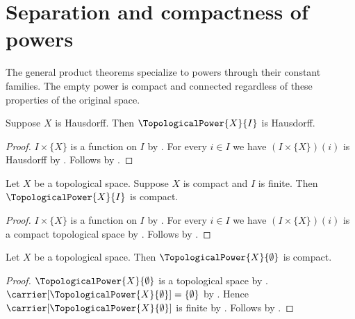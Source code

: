 \section{Separation and compactness of powers}






The general product theorems specialize to powers through their constant
families. The empty power is compact and connected regardless of these
properties of the original space.

\begin{theorem}\label{topological_power_is_hausdorff}
    Suppose $X$ is Hausdorff.
    Then $\TopologicalPower{X}{I}$ is Hausdorff.
\end{theorem}
\begin{proof}
    $I\times\{X\}$ is a function on $I$ by .
    For every $i\in I$ we have $(I\times\{X\})(i)$ is Hausdorff by
        .
    Follows by .
\end{proof}

\begin{theorem}\label{finite_topological_power_is_compact}
    Let $X$ be a topological space.
    Suppose $X$ is compact and $I$ is finite.
    Then $\TopologicalPower{X}{I}$ is compact.
\end{theorem}
\begin{proof}
    $I\times\{X\}$ is a function on $I$ by .
    For every $i\in I$ we have $(I\times\{X\})(i)$ is a compact topological space by
        .
    Follows by .
\end{proof}

\begin{theorem}\label{empty_topological_power_is_compact}
    Let $X$ be a topological space.
    Then $\TopologicalPower{X}{\emptyset}$ is compact.
\end{theorem}
\begin{proof}
    $\TopologicalPower{X}{\emptyset}$ is a topological space by
        .
    $\carrier[\TopologicalPower{X}{\emptyset}]=\{\emptyset\}$ by
        .
    Hence $\carrier[\TopologicalPower{X}{\emptyset}]$ is finite by .
    Follows by .
\end{proof}

